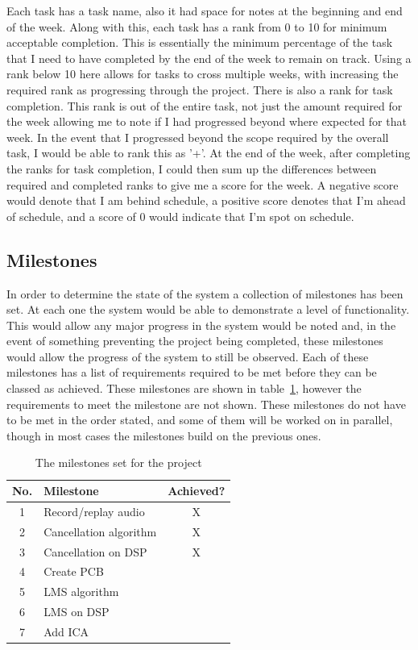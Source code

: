 Each task has a task name, also it had space for notes at the beginning and end of the week. Along with this, each task has a rank from 0 to 10 for minimum acceptable completion. This is essentially the minimum percentage of the task that I need to have completed by the end of the week to remain on track. Using a rank below 10 here allows for tasks to cross multiple weeks, with increasing the required rank as progressing through the project.
There is also a rank for task completion. This rank is out of the entire task, not just the amount required for the week allowing me to note if I had progressed beyond where expected for that week. In the event that I progressed beyond the scope required by the overall task, I would be able to rank this as '+'.
At the end of the week, after completing the ranks for task completion, I could then sum up the differences between required and completed ranks to give me a score for the week.
A negative score would denote that I am behind schedule, a positive score denotes that I'm ahead of schedule, and a score of 0 would indicate that I'm spot on schedule.

\subsection{Milestones}
In order to determine the state of the system a collection of milestones has been set.
At each one the system would be able to demonstrate a level of functionality.
This would allow any major progress in the system would be noted and, in the event of something preventing the project being completed, these milestones would allow the progress of the system to still be observed.
Each of these milestones has a list of requirements required to be met before they can be classed as achieved.
These milestones are shown in table~\ref{tab:milestones}, however the requirements to meet the milestone are not shown.
These milestones do not have to be met in the order stated, and some of them will be worked on in parallel, though in most cases the milestones build on the previous ones.

\begin{table}[H]
	\centering
	\begin{tabular}[c]{| c | l | c |}
		\hline
		No.	& Milestone		& Achieved? \\
		\hline
		1	& Record/replay audio	& X \\
		2	& Cancellation algorithm & X \\
		3	& Cancellation on DSP	& X \\
		4	& Create PCB		& \\
		5	& LMS algorithm		& \\
		6	& LMS on DSP		& \\
		7	& Add ICA		& \\
		\hline
	\end{tabular}
	\caption{The milestones set for the project}
	\label{tab:milestones}
\end{table}
